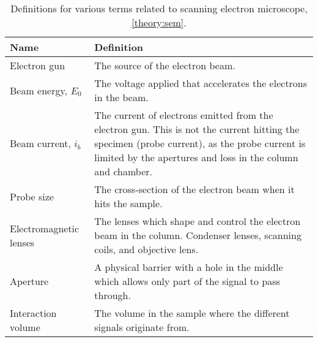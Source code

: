 \begin{table}[phb]
    \begin{center}
        \caption{
            Definitions for various terms related to scanning electron microscope, \cref{theory:sem}.
        }
        \renewcommand*{\arraystretch}{1.4}
        \label{tab:sem}
        \begin{tabular}{p{4cm}p{10.6cm}}
            \hline
            \textbf{Name}           & \textbf{Definition}                                                                                                                                                                                        \\
            \hline
            Electron gun            & The source of the electron beam.                                                                                                                                                                           \\
            Beam energy, $E_0$      & The voltage applied that accelerates the electrons in the beam.                                                                                                                                            \\
            Beam current, $i_b$     & The current of electrons emitted from the electron gun. This is not the current hitting the specimen (probe current), as the probe current is limited by the apertures and loss in the column and chamber. \\
            Probe size              & The cross-section of the electron beam when it hits the sample.                                                                                                                                            \\
            Electromagnetic lenses  & The lenses which shape and control the electron beam in the column. Condenser lenses, scanning coils, and objective lens.                                                                                  \\
            Aperture                & A physical barrier with a hole in the middle which allows only part of the signal to pass through.                                                                                                         \\
            Interaction volume      & The volume in the sample where the different signals originate from.                                                                                                                                       \\

\end{tabular}
\end{center}
\end{table}
